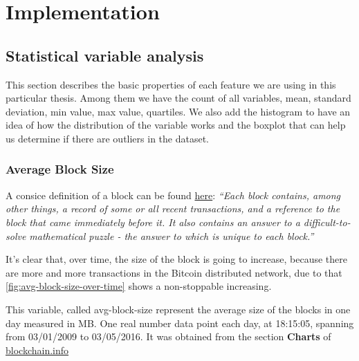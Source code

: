 
\chapter{Implementation} %

\label{ch:implementation}


\section{Statistical variable analysis}
\label{sec:stat-var-analysis}

This section describes the basic properties of each feature we are
using in this particular thesis. Among them we have the count of all
variables, mean, standard deviation, min value, max value, quartiles.
We also add the histogram to have an idea of how the distribution of
the variable works and the boxplot that can help us determine if there
are outliers in the dataset.

\subsection{Average Block Size}
\label{sec:avg-block-size}

A consice definition of a block can be found
\href{https://en.bitcoin.it/wiki/Block}{here}: \textit{``Each block
  contains, among other things, a record of some or all recent
  transactions, and a reference to the block that came immediately
  before it. It also contains an answer to a difficult-to-solve
  mathematical puzzle - the answer to which is unique to each
  block.''}

It's clear that, over time, the size of the block is going to
increase, because there are more and more transactions in the Bitcoin
distributed network, due to that
\autoref{fig:avg-block-size-over-time} shows a non-stoppable
increasing.

This variable, called avg-block-size represent the average size of the
blocks in one day measured in MB. One real number data point each day,
at 18:15:05, spanning from 03/01/2009 to 03/05/2016. It was obtained
from the section \textbf{Charts} of
\href{blockchain.info}{blockchain.info}

